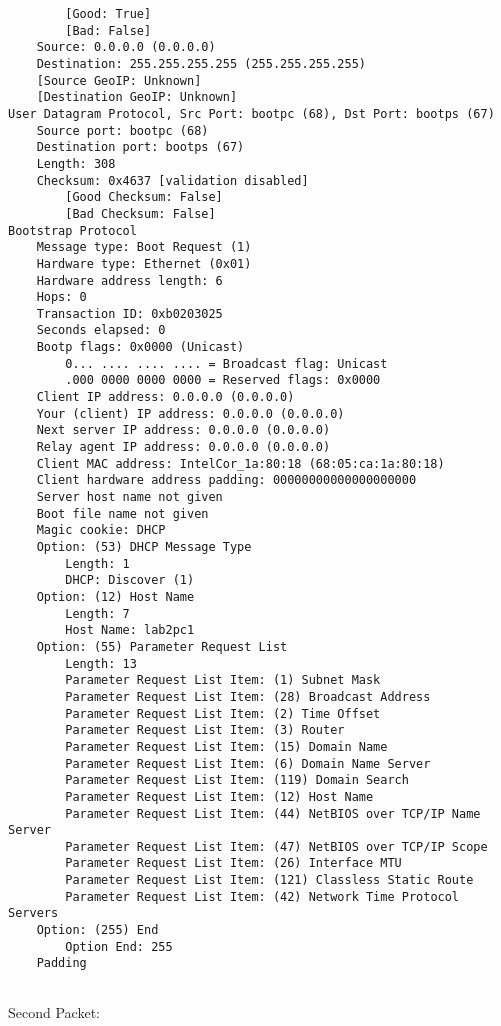 \begin{lstlisting}
        [Good: True]
        [Bad: False]
    Source: 0.0.0.0 (0.0.0.0)
    Destination: 255.255.255.255 (255.255.255.255)
    [Source GeoIP: Unknown]
    [Destination GeoIP: Unknown]
User Datagram Protocol, Src Port: bootpc (68), Dst Port: bootps (67)
    Source port: bootpc (68)
    Destination port: bootps (67)
    Length: 308
    Checksum: 0x4637 [validation disabled]
        [Good Checksum: False]
        [Bad Checksum: False]
Bootstrap Protocol
    Message type: Boot Request (1)
    Hardware type: Ethernet (0x01)
    Hardware address length: 6
    Hops: 0
    Transaction ID: 0xb0203025
    Seconds elapsed: 0
    Bootp flags: 0x0000 (Unicast)
        0... .... .... .... = Broadcast flag: Unicast
        .000 0000 0000 0000 = Reserved flags: 0x0000
    Client IP address: 0.0.0.0 (0.0.0.0)
    Your (client) IP address: 0.0.0.0 (0.0.0.0)
    Next server IP address: 0.0.0.0 (0.0.0.0)
    Relay agent IP address: 0.0.0.0 (0.0.0.0)
    Client MAC address: IntelCor_1a:80:18 (68:05:ca:1a:80:18)
    Client hardware address padding: 00000000000000000000
    Server host name not given
    Boot file name not given
    Magic cookie: DHCP
    Option: (53) DHCP Message Type
        Length: 1
        DHCP: Discover (1)
    Option: (12) Host Name
        Length: 7
        Host Name: lab2pc1
    Option: (55) Parameter Request List
        Length: 13
        Parameter Request List Item: (1) Subnet Mask
        Parameter Request List Item: (28) Broadcast Address
        Parameter Request List Item: (2) Time Offset
        Parameter Request List Item: (3) Router
        Parameter Request List Item: (15) Domain Name
        Parameter Request List Item: (6) Domain Name Server
        Parameter Request List Item: (119) Domain Search
        Parameter Request List Item: (12) Host Name
        Parameter Request List Item: (44) NetBIOS over TCP/IP Name Server
        Parameter Request List Item: (47) NetBIOS over TCP/IP Scope
        Parameter Request List Item: (26) Interface MTU
        Parameter Request List Item: (121) Classless Static Route
        Parameter Request List Item: (42) Network Time Protocol Servers
    Option: (255) End
        Option End: 255
    Padding


\end{lstlisting}
Second Packet:\\

